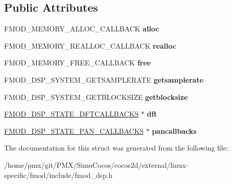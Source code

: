 \subsection*{Public Attributes}
\begin{DoxyCompactItemize}
\item 
\mbox{\label{structFMOD__DSP__STATE__SYSTEMCALLBACKS_ad3bef50d2425783451b5e88aafd7b8a1}} 
F\+M\+O\+D\+\_\+\+M\+E\+M\+O\+R\+Y\+\_\+\+A\+L\+L\+O\+C\+\_\+\+C\+A\+L\+L\+B\+A\+CK {\bfseries alloc}
\item 
\mbox{\label{structFMOD__DSP__STATE__SYSTEMCALLBACKS_a25d94a409c725ccaea9267577966d04a}} 
F\+M\+O\+D\+\_\+\+M\+E\+M\+O\+R\+Y\+\_\+\+R\+E\+A\+L\+L\+O\+C\+\_\+\+C\+A\+L\+L\+B\+A\+CK {\bfseries realloc}
\item 
\mbox{\label{structFMOD__DSP__STATE__SYSTEMCALLBACKS_af672bd67d86b20fb59f3f6f93297e888}} 
F\+M\+O\+D\+\_\+\+M\+E\+M\+O\+R\+Y\+\_\+\+F\+R\+E\+E\+\_\+\+C\+A\+L\+L\+B\+A\+CK {\bfseries free}
\item 
\mbox{\label{structFMOD__DSP__STATE__SYSTEMCALLBACKS_a24e5b8fc74c3c1cc4a9b883d3e176a42}} 
F\+M\+O\+D\+\_\+\+D\+S\+P\+\_\+\+S\+Y\+S\+T\+E\+M\+\_\+\+G\+E\+T\+S\+A\+M\+P\+L\+E\+R\+A\+TE {\bfseries getsamplerate}
\item 
\mbox{\label{structFMOD__DSP__STATE__SYSTEMCALLBACKS_ae8cf757a83d6859c03798fd958e1825c}} 
F\+M\+O\+D\+\_\+\+D\+S\+P\+\_\+\+S\+Y\+S\+T\+E\+M\+\_\+\+G\+E\+T\+B\+L\+O\+C\+K\+S\+I\+ZE {\bfseries getblocksize}
\item 
\mbox{\label{structFMOD__DSP__STATE__SYSTEMCALLBACKS_afbf919f4e42ceffe427e4ca030f180eb}} 
\hyperlink{structFMOD__DSP__STATE__DFTCALLBACKS}{F\+M\+O\+D\+\_\+\+D\+S\+P\+\_\+\+S\+T\+A\+T\+E\+\_\+\+D\+F\+T\+C\+A\+L\+L\+B\+A\+C\+KS} $\ast$ {\bfseries dft}
\item 
\mbox{\label{structFMOD__DSP__STATE__SYSTEMCALLBACKS_a6b4516767d5b65dbb97269b59b5b6634}} 
\hyperlink{structFMOD__DSP__STATE__PAN__CALLBACKS}{F\+M\+O\+D\+\_\+\+D\+S\+P\+\_\+\+S\+T\+A\+T\+E\+\_\+\+P\+A\+N\+\_\+\+C\+A\+L\+L\+B\+A\+C\+KS} $\ast$ {\bfseries pancallbacks}
\end{DoxyCompactItemize}


The documentation for this struct was generated from the following file\+:\begin{DoxyCompactItemize}
\item 
/home/pmx/git/\+P\+M\+X/\+Simu\+Cocos/cocos2d/external/linux-\/specific/fmod/include/fmod\+\_\+dsp.\+h\end{DoxyCompactItemize}

